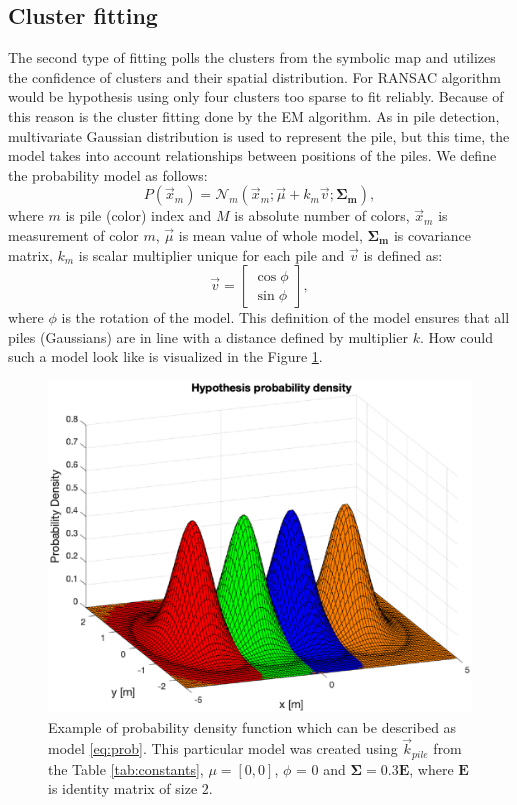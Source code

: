 \subsection{Cluster fitting}
The second type of fitting polls the clusters from the symbolic map and utilizes the confidence of clusters and their spatial distribution. For RANSAC algorithm would be hypothesis using only four clusters too sparse to fit reliably. Because of this reason is the cluster fitting done by the EM algorithm. As in pile detection, multivariate Gaussian distribution is used to represent the pile, but this time, the model takes into account relationships between positions of the piles. We define the probability model as follows:
\begin{equation}
P(\vec{x}_m) = \mathcal{N}_m(\vec{x}_m; \vec{\mu} + k_m\vec{v}; \bm{\Sigma_m}),
\label{eq:prob}
\end{equation}
where $m$ is pile (color) index and $M$ is absolute number of colors, $\vec{x}_m$ is measurement of color $m$, $\vec{\mu}$ is mean value of whole model, $\bm{\Sigma_m}$ is covariance matrix, $k_m$ is scalar multiplier unique for each pile and $\vec{v}$ is defined as:
\begin{equation}
\vec{v} = \begin{bmatrix}
\cos \phi \\
\sin \phi
\end{bmatrix},
\end{equation}
where $\phi$ is the rotation of the model. This definition of the model ensures that all piles (Gaussians) are in line with a distance defined by multiplier $k$. How could such a model look like is visualized in the Figure \ref{fig:mnd}.

\begin{figure}[H]
	\centering
	\includegraphics[scale=0.55]{fig/model_mnd.eps}
	\caption[Hypothesis ambiguity]{Example of probability density function which can be described as model \ref{eq:prob}. This particular model was created using $\vec{k}_{pile}$ from the Table \ref{tab:constants}, $\mu = [0, 0]$, $\phi$ = 0 and $\bm{\Sigma} = 0.3\bm{E}$, where $\bm{E}$ is identity matrix of size $2$.}
	\label{fig:mnd}
\end{figure}

